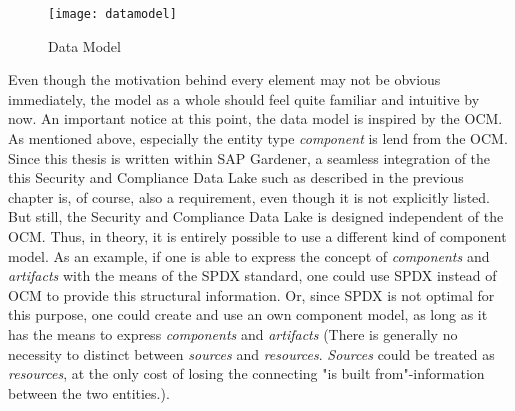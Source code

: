 \begin{figure}[H]
	\centering
	\texttt{[image: datamodel]}
	\caption[Data Model]{Data Model }
	\label{fig:DataModel}
\end{figure} 

Even though the motivation behind every element may not be obvious immediately, the model as a whole should feel quite familiar and intuitive by now. An important notice at this point, the data model is inspired by the OCM. As mentioned above, especially the entity type \emph{component} is lend from the OCM. Since this thesis is written within SAP Gardener, a seamless integration of the this Security and Compliance Data Lake such as described in the previous chapter is, of course, also a requirement, even though it is not explicitly listed. But still, the Security and Compliance Data Lake is designed independent of the OCM. Thus, in theory, it is entirely possible to use a different kind of component model. As an example, if one is able to express the concept of \emph{components} and \emph{artifacts} with the means of the SPDX standard, one could use SPDX instead of OCM to provide this structural information. Or, since SPDX is not optimal for this purpose, one could create and use an own component model, as long as it has the means to express \emph{components} and \emph{artifacts} (There is generally no necessity to distinct between \emph{sources} and \emph{resources}. \emph{Sources} could be treated as \emph{resources}, at the only cost of losing the connecting "is built from"-information between the two entities.).

